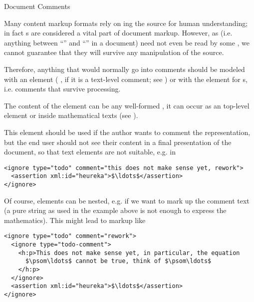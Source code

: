 \begin{omgroup}[id=omdoc-infrastructure,short=Document Infrastructure]
\begin{omgroup}[id=comment]{Document Comments}
\begin{module}[id=comments]
Many content markup formats rely on {ing} the source for human
understanding; in fact {s} are considered a vital part of
document markup. However, as {\xml}  (i.e. anything
between ``{}'' and ``{\snippetin{-->}}'' in a document) need not
even be read by some {\xml} , we cannot guarantee that they
will survive any {\xml} manipulation of the {\omdoc} source.

Therefore, anything that would normally go into comments should be modeled with an
{} element ({} {},
if it is a text-level comment; see {}) or with the {}
element for {s}, i.e.  comments that survive processing. 

\begin{definition}[id=ignore.def]
  The content of the {} element can be any well-formed {\omdoc}, it can
  occur as an {\omdoc} top-level element or inside mathematical texts (see
  {}).
\end{definition}
This element should be used if the author wants to comment the {\omdoc} representation,
but the end user should not see their content in a final presentation of the document, so
that {\omdoc} text elements are not suitable, e.g. in

\begin{lstlisting}[numbers=none,index={ignore},mathescape]
<ignore type="todo" comment="this does not make sense yet, rework">
  <assertion xml:id="heureka">$\ldots$</assertion>
</ignore>
\end{lstlisting}

Of course, {} elements can be nested, e.g. if we want to mark up
the comment text (a pure string as used in the example above is not enough to
express the mathematics). This might lead to markup like 

\begin{lstlisting}[label=nested-ignore,numbers=none,index={ignore},mathescape]
<ignore type="todo" comment="rework">
  <ignore type="todo-comment">
    <h:p>This does not make sense yet, in particular, the equation 
      $\psom\ldots$ cannot be true, think of $\psom\ldots$
    </h:p>
  </ignore>
  <assertion xml:id="heureka">$\ldots$</assertion>
</ignore>
\end{lstlisting}


\end{module}
\end{omgroup}
\end{omgroup}
